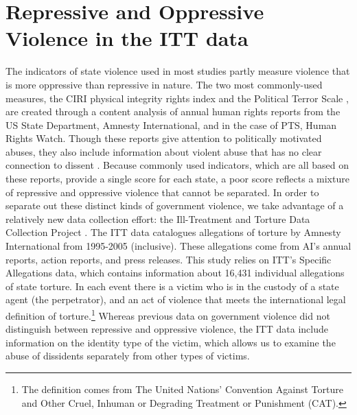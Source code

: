 \documentclass[11pt]{article}
\begin{document}
\section*{Repressive and Oppressive Violence in the ITT data} 
The indicators of state violence used in most studies partly measure violence that is more oppressive than repressive in nature. The two most commonly-used measures, the CIRI physical integrity rights index \citep{CIRI2014} and the Political Terror Scale \citep{PTS2018}, are created through a content analysis of annual human rights reports from the US State Department, Amnesty International, and in the case of PTS, Human Rights Watch. Though these reports give attention to politically motivated abuses, they also include information about violent abuse that has no clear connection to dissent \citep[][pp.\ 13--16, 90--91]{Haschke2018}. Because commonly used indicators, which are all based on these reports, provide a single score for each state, a poor score reflects a mixture of repressive and oppressive violence that cannot be separated. In order to separate out these distinct kinds of government violence, we take advantage of a relatively new data collection effort: the Ill-Treatment and Torture Data Collection Project \citep{ConradHaglundMoore2014}. The ITT data catalogues allegations of torture by Amnesty International from 1995-2005 (inclusive). These allegations come from AI's annual reports, action reports, and press releases. This study relies on ITT's Specific Allegations data, which contains information about 16,431 individual allegations of state torture. In each event there is a victim who is in the custody of a state agent (the perpetrator), and an act of violence that meets the international legal definition of torture.\footnote{The definition comes from The United Nations' Convention Against Torture and Other Cruel, Inhuman or Degrading Treatment or Punishment (CAT).} Whereas previous data on government violence did not distinguish between repressive and oppressive violence, the ITT data include information on the identity type of the victim, which allows us to examine the abuse of dissidents separately from other types of victims. 
\end{document}
